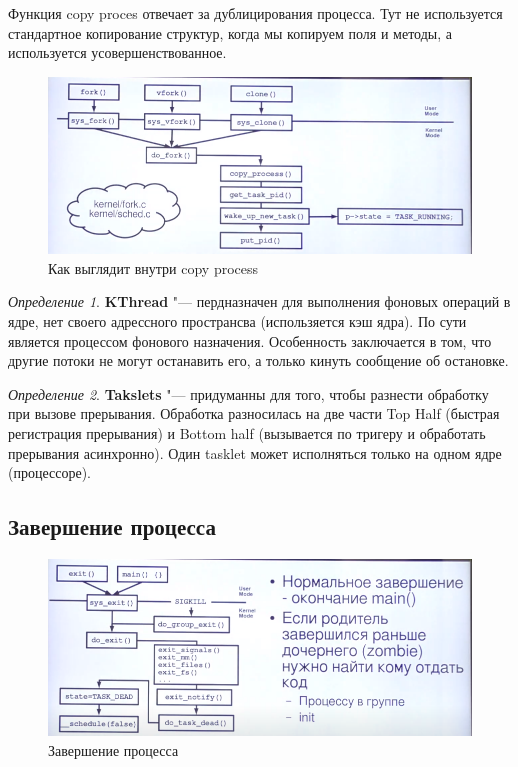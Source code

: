 \documentclass[bachelor, och, book]{SCWorks}
\theoremstyle{remark}
\newtheorem{definition}{Определение}
\begin{document}
    Функция copy proces отвечает за дублицирования процесса. Тут не используется стандартное копирование структур, когда мы копируем поля и методы, а используется усовершенствованное.

    \begin{figure}[H]
        \begin{center}
            \includegraphics[scale=0.50]{res/copy-process.png}
            \caption{Как выглядит внутри copy process}
        \end{center}
    \end{figure}

    \begin{definition}
        \textbf{KThread} "--- пердназначен для выполнения фоновых операций в ядре, нет своего адрессного пространсва (использяется кэш ядра). По сути является процессом фонового назначения. Особенность заключается в том, что другие потоки не могут останавить его, а только кинуть сообщение об остановке.
    \end{definition}

    \begin{definition}
        \textbf{Takslets} "--- придуманны для того, чтобы разнести обработку при вызове прерывания. Обработка разносилась на две части Top Half (быстрая регистрация прерывания) и Bottom half (вызывается по тригеру и обработать прерывания асинхронно). Один tasklet может исполняться только на одном ядре (процессоре).
    \end{definition}

    \subsection{Завершение процесса}

    \begin{figure}[H]
        \begin{center}
            \includegraphics[scale=0.50]{res/final-proces.png}
            \caption{Завершение процесса}
        \end{center}
    \end{figure}
\end{document}
